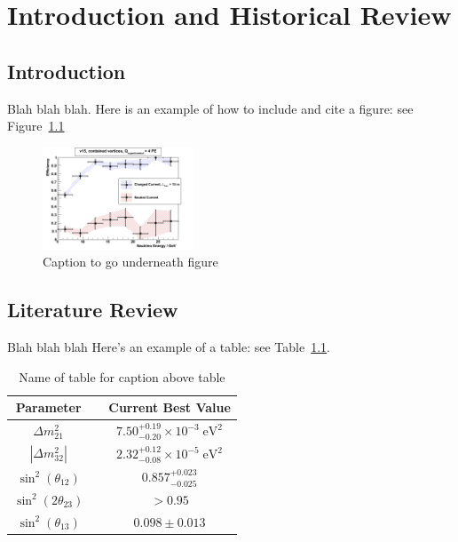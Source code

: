 \chapter{Introduction and Historical Review}
\newpage

\section{Introduction}
Blah blah blah. Here is an example of how to include and cite a figure: see Figure~\ref{fig:example_figure}
\begin{figure}[H]
\center\includegraphics[width=0.4\textwidth]{figures/ExampleFigure.png}
\caption[Caption to go in list of figures]{Caption to go underneath figure}
\label{fig:example_figure}
\end{figure}

\section{Literature Review}
Blah blah blah Here's an example of a table: see Table~\ref{tab:best_values}.

\begin{table}[H]
\centering\onehalfspacing
\vline
\begin{tabular}{c c c}
\hline
\textbf{Parameter} & \vline & \textbf{Current Best Value}\\
\hline
$\Delta m^2_{21}$ & \vline & $7.50^{+0.19}_{-0.20} \times 10^{-3}\;\mathrm{eV}^2$\\
$|\Delta m^2_{32}|$ & \vline & $2.32^{+0.12}_{-0.08} \times 10^{-5}\;\mathrm{eV}^2$\\
$\sin^2{(\theta_{12})}$ & \vline & $0.857^{+0.023}_{-0.025}$\\
$\sin^2{(2\theta_{23})}$ & \vline & $>0.95$\\
$\sin^2{(\theta_{13})}$ & \vline &  $0.098\pm 0.013$\\
\hline\end{tabular}\vline
\captionsetup{width=0.86\textwidth}
\caption[Name of table for list of tables]{Name of table for caption above table}
\label{tab:best_values}
\end{table}

